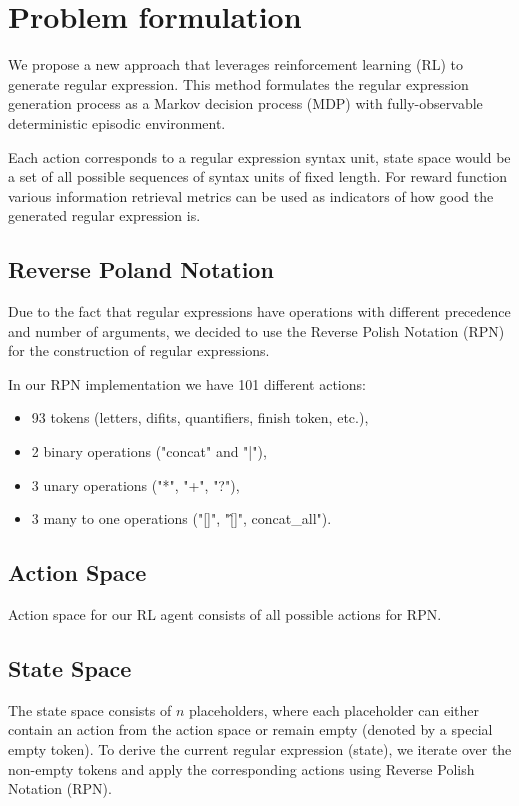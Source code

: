 \documentclass{article}
\begin{document}
\section{Problem formulation}

We propose a new approach that leverages reinforcement learning (RL) to generate regular expression. 
This method formulates the regular expression generation process as a Markov decision process (MDP) 
with fully-observable deterministic episodic environment.

Each action corresponds to a regular expression syntax unit, state space would be a set of all possible sequences 
of syntax units of fixed length. For reward function various information retrieval metrics can be used as indicators 
of how good the generated regular expression is.

\subsection{Reverse Poland Notation}
Due to the fact that regular expressions have operations with different precedence and number of arguments, 
we decided to use the Reverse Polish Notation (RPN) for the construction of regular expressions.

In our RPN implementation we have 101 different actions:
\begin{itemize}
  \item 93 tokens (letters, difits, quantifiers, finish token, etc.),
  \item 2 binary operations ("concat" and "|"),
  \item 3 unary operations ("*", "+", "?"),
  \item 3 many to one operations ("[]", "\^[]", concat\_all").
\end{itemize}

\subsection{Action Space}
Action space for our RL agent consists of all possible actions for RPN.

\subsection{State Space}
The state space consists of $n$ placeholders, where each placeholder can either contain an action 
from the action space or remain empty (denoted by a special empty token).
To derive the current regular expression (state), we iterate over the non-empty tokens and apply the corresponding 
actions using Reverse Polish Notation (RPN).
\end{document}
